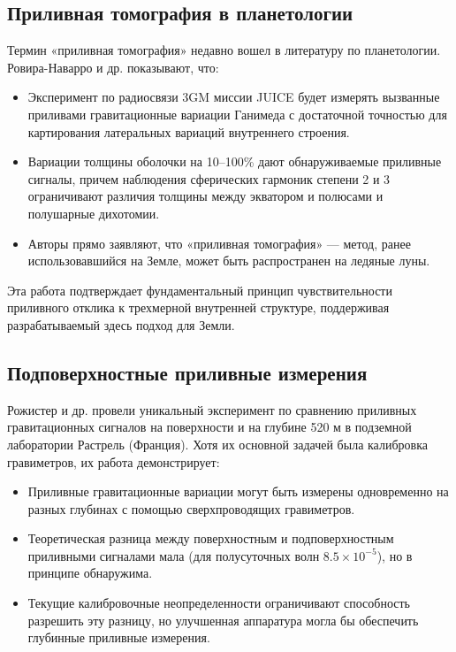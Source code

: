 \documentclass[12pt,a4paper]{article}
\theoremstyle{remark}
\begin{document}
	\subsection{Приливная томография в планетологии}
	
	Термин «приливная томография» недавно вошел в литературу по планетологии. Ровира-Наварро и др. \cite{RoviraNavarro2025} показывают, что:
	
	\begin{itemize}
		\item Эксперимент по радиосвязи 3GM миссии JUICE будет измерять вызванные приливами гравитационные вариации Ганимеда с достаточной точностью для картирования латеральных вариаций внутреннего строения.
		\item Вариации толщины оболочки на 10–100\% дают обнаруживаемые приливные сигналы, причем наблюдения сферических гармоник степени 2 и 3 ограничивают различия толщины между экватором и полюсами и полушарные дихотомии.
		\item Авторы прямо заявляют, что «приливная томография» — метод, ранее использовавшийся на Земле, может быть распространен на ледяные луны.
	\end{itemize}
	
	Эта работа подтверждает фундаментальный принцип чувствительности приливного отклика к трехмерной внутренней структуре, поддерживая разрабатываемый здесь подход для Земли.
	
	\subsection{Подповерхностные приливные измерения}
	
	Рожистер и др. \cite{Rogister2024} провели уникальный эксперимент по сравнению приливных гравитационных сигналов на поверхности и на глубине 520 м в подземной лаборатории Растрель (Франция). Хотя их основной задачей была калибровка гравиметров, их работа демонстрирует:
	
	\begin{itemize}
		\item Приливные гравитационные вариации могут быть измерены одновременно на разных глубинах с помощью сверхпроводящих гравиметров.
		\item Теоретическая разница между поверхностным и подповерхностным приливными сигналами мала (для полусуточных волн $8.5 \times 10^{-5}$), но в принципе обнаружима.
		\item Текущие калибровочные неопределенности ограничивают способность разрешить эту разницу, но улучшенная аппаратура могла бы обеспечить глубинные приливные измерения.
	\end{itemize}
	
\end{document}
